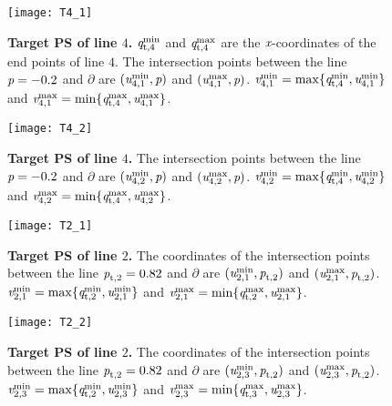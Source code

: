 \begin{figure}
\begin{minipage}[t]{.48\textwidth}
\centering
   \texttt{[image: T4\_1]}
  \caption{\footnotesize{\textbf{Target PS of line $4$.} $\textit{q}_{\textrm{t,} \textit{$4$}}^{\textrm{min}}$ and $\textit{q}_{\textrm{t,} \textit{$4$}}^{\textrm{max}}$ are the $\textit{x}$-coordinates of the end points of line $4$.
  The intersection points between the line $\textit{p} = -0.2$ and $\partial$ are $(\textit{u}_{4,1}^{\textrm{min}}, \textit{p})$ and
  $(\textit{u}_{4,1}^{\textrm{max}}, \textit{p})$. $\textit{v}_{4,1}^{\textrm{min}}= \max \{\textit{q}_{\textrm{t,} \textit{$4$}}^{\textrm{min}}, \textit{u}_{4,1}^{\textrm{min}}\}$ and
  $\textit{v}_{4,1}^{\textrm{max}}= \min \{\textit{q}_{\textrm{t,} \textit{$4$}}^{\textrm{max}}, \textit{u}_{4,1}^{\textrm{max}}\}$.}}
   \label{fig:T41}
\end{minipage}\hfill
 \begin{minipage}[t]{.48\textwidth}
  \centering
   \texttt{[image: T4\_2]}
   \caption{\footnotesize{\textbf{Target PS of line $4$.}
  The intersection points between the line $\textit{p} = -0.2$ and $\partial$ are $(\textit{u}_{4,2}^{\textrm{min}}, \textit{p})$ and
  $(\textit{u}_{4,2}^{\textrm{max}}, \textit{p})$. $\textit{v}_{4,2}^{\textrm{min}}= \max \{\textit{q}_{\textrm{t,} \textit{$4$}}^{\textrm{min}}, \textit{u}_{4,2}^{\textrm{min}}\}$ and
  $\textit{v}_{4,2}^{\textrm{max}}= \min \{\textit{q}_{\textrm{t,} \textit{$4$}}^{\textrm{max}}, \textit{u}_{4,2}^{\textrm{max}}\}$.\\}}
   \label{fig:T42}
 \end{minipage}\hfill
 \begin{minipage}[t]{.48\textwidth}
   \centering
   \texttt{[image: T2\_1]}
   \caption{\footnotesize{\textbf{Target PS of line $2$.} The coordinates of the intersection points between the line $\textit{p}_{\textrm{t,} \textit{$2$}} = 0.82$ and $\partial$ are
  $(\textit{u}_{2,1}^{\textrm{min}}, \textit{p}_{\textrm{t,} \textit{$2$}})$ and $(\textit{u}_{2,1}^{\textrm{max}}, \textit{p}_{\textrm{t,} \textit{$2$}})$.
  $\textit{v}_{2,1}^{\textrm{min}}= \max \{\textit{q}_{\textrm{t,} \textit{$2$}}^{\textrm{min}}, \textit{u}_{2,1}^{\textrm{min}}\}$ and
  $\textit{v}_{2,1}^{\textrm{max}}= \min \{\textit{q}_{\textrm{t,} \textit{$2$}}^{\textrm{max}}, \textit{u}_{2,1}^{\textrm{max}}\}$.}}
    \label{fig:T21}
 \end{minipage}\hfill
 \begin{minipage}[t]{.48\textwidth}
  \centering
   \texttt{[image: T2\_2]}
\caption{\footnotesize{\textbf{Target PS of line $2$.}
  The coordinates of the intersection points between the line $\textit{p}_{\textrm{t,} \textit{$2$}}=0.82$ and $\partial$ are
  $(\textit{u}_{2,3}^{\textrm{min}}, \textit{p}_{\textrm{t,} \textit{$2$}})$ and $(\textit{u}_{2,3}^{\textrm{max}}, \textit{p}_{\textrm{t,} \textit{$2$}})$.
  $\textit{v}_{2,3 }^{\textrm{min}} = \max\{\textit{q}_{\textrm{t,} \textit{$2$}}^{\textrm{min}}, \textit{u}_{2,3}^{\textrm{min}}\}$ and
   $\textit{v}_{2,3 }^{\textrm{max}} = \min\{\textit{q}_{\textrm{t,} \textit{$3$}}^{\textrm{max}}, \textit{u}_{2,3}^{\textrm{max}}\}$.}}
 \label{fig:T22}
 \end{minipage}\hfill
 \end{figure}
